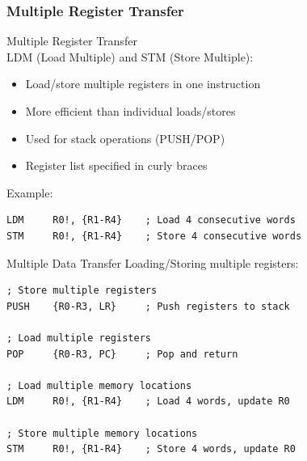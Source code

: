 \columnbreak


\subsubsection{Multiple Register Transfer}

\begin{definition}{Multiple Register Transfer}\\
LDM (Load Multiple) and STM (Store Multiple):
\begin{itemize}
  \item Load/store multiple registers in one instruction
  \item More efficient than individual loads/stores
  \item Used for stack operations (PUSH/POP)
  \item Register list specified in curly braces
\end{itemize}

Example:
\begin{lstlisting}[language=armasm, style=basesmol]
LDM     R0!, {R1-R4}    ; Load 4 consecutive words
STM     R0!, {R1-R4}    ; Store 4 consecutive words
\end{lstlisting}
\end{definition}

\begin{example2}{Multiple Data Transfer}
Loading/Storing multiple registers:
\begin{lstlisting}[language=armasm, style=basesmol]
; Store multiple registers
PUSH    {R0-R3, LR}     ; Push registers to stack

; Load multiple registers
POP     {R0-R3, PC}     ; Pop and return

; Load multiple memory locations
LDM     R0!, {R1-R4}    ; Load 4 words, update R0

; Store multiple memory locations
STM     R0!, {R1-R4}    ; Store 4 words, update R0
\end{lstlisting}
\end{example2}

